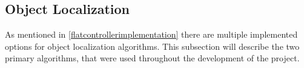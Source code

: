 \subsection{Object Localization}\label{solution:ObjectLocalization}
As mentioned in \autoref{flatcontrollerimplementation} there are multiple implemented options for object localization algorithms.
This subsection will describe the two primary algorithms, that were used throughout the development of the project.


